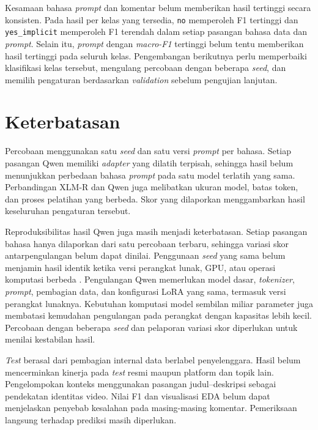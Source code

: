 \documentclass[11pt]{article}
\begin{document}
Kesamaan bahasa \textit{prompt} dan komentar belum memberikan hasil tertinggi secara konsisten. Pada hasil per kelas yang tersedia, \texttt{no} memperoleh F1 tertinggi dan \texttt{yes\_implicit} memperoleh F1 terendah dalam setiap pasangan bahasa data dan \textit{prompt}. Selain itu, \textit{prompt} dengan \textit{macro-F1} tertinggi belum tentu memberikan hasil tertinggi pada seluruh kelas. Pengembangan berikutnya perlu memperbaiki klasifikasi kelas tersebut, mengulang percobaan dengan beberapa \textit{seed}, dan memilih pengaturan berdasarkan \textit{validation} sebelum pengujian lanjutan.

\section*{Keterbatasan}
Percobaan menggunakan satu \textit{seed} dan satu versi \textit{prompt} per bahasa. Setiap pasangan Qwen memiliki \textit{adapter} yang dilatih terpisah, sehingga hasil belum menunjukkan perbedaan bahasa \textit{prompt} pada satu model terlatih yang sama. Perbandingan XLM-R dan Qwen juga melibatkan ukuran model, batas token, dan proses pelatihan yang berbeda. Skor yang dilaporkan menggambarkan hasil keseluruhan pengaturan tersebut.

Reproduksibilitas hasil Qwen juga masih menjadi keterbatasan. Setiap pasangan bahasa hanya dilaporkan dari satu percobaan terbaru, sehingga variasi skor antarpengulangan belum dapat dinilai. Penggunaan \textit{seed} yang sama belum menjamin hasil identik ketika versi perangkat lunak, GPU, atau operasi komputasi berbeda \citep{pytorch-reproducibility}. Pengulangan Qwen memerlukan model dasar, \textit{tokenizer}, \textit{prompt}, pembagian data, dan konfigurasi LoRA yang sama, termasuk versi perangkat lunaknya. Kebutuhan komputasi model sembilan miliar parameter juga membatasi kemudahan pengulangan pada perangkat dengan kapasitas lebih kecil. Percobaan dengan beberapa \textit{seed} dan pelaporan variasi skor diperlukan untuk menilai kestabilan hasil.

\textit{Test} berasal dari pembagian internal data berlabel penyelenggara. Hasil belum mencerminkan kinerja pada \textit{test} resmi maupun platform dan topik lain. Pengelompokan konteks menggunakan pasangan judul--deskripsi sebagai pendekatan identitas video. Nilai F1 dan visualisasi EDA belum dapat menjelaskan penyebab kesalahan pada masing-masing komentar. Pemeriksaan langsung terhadap prediksi masih diperlukan.


\end{document}
